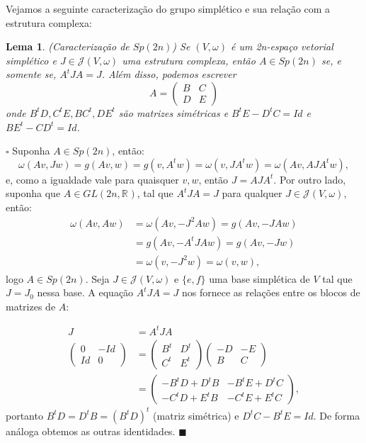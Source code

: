 \documentclass[12pt]{book}
\newtheorem{lema}[teorema]{Lema}
\newenvironment{prova}[1]{$\square$ #1}{\hfill$\blacksquare$}
\newcommand{\estruturacomplexa}{J_{0}}
\newcommand{\estruturascomplexaspadrao}{\mathcal{J}(V, \omega)}
\newcommand{\generalgroup}[2]{GL(#1, #2)}
\newcommand{\generalgroupreal}[1]{\generalgroup{#1}{\real{}}}
\newcommand{\gruposimpletico}[1]{Sp(#1)}
\newcommand{\real}[1]{\mathbb{R}^{#1}}
\begin{document}
	Vejamos a seguinte caracterização do grupo simplético e sua relação com a estrutura complexa:
	
	\begin{lema}\label{lema_caracterizacao_Sp2n}
		(Caracterização de $Sp(2n)$) Se $(V, \omega)$ é um 2n-espaço vetorial simplético e $J \in \estruturascomplexaspadrao$ uma estrutura complexa, então $A\in Sp(2n)$ se, e somente se, $A^{t}JA = J$. Além disso, podemos escrever 
		$$
		A=
		\left(
		\begin{array}{cc}
		B & C
		\\
		D & E
		\end{array}
		\right)
		$$
		onde $B^{t}D, C^{t}E, BC^{t}, DE^{t} $ são matrizes simétricas e $B^{t}E - D^{t}C = Id$ e $BE^{t} - CD^{t} = Id$.
	\end{lema}
	\begin{prova}
		Suponha $A \in Sp(2n)$, então:
		$$
		\omega(Av, Jw)= g(Av,w) = g(v,A^{t}w) = \omega(v, JA^{t}w) = \omega(Av, AJA^{t}w),
		$$
		e, como a igualdade vale para quaisquer $v,w$, então $J = AJA^{t}$. Por outro lado, suponha que $A \in \generalgroupreal{2n}$, tal que $A^{t}JA=J$ para qualquer $J \in \estruturascomplexaspadrao$, então:
		$$
		\begin{aligned}
		\omega(Av, Aw) &= \omega(Av, -J^{2}Aw)=g(Av, -JAw) \\
		&= g(Av, -A^{t}JAw) = g(Av, -Jw) 
		\\
		&= \omega(v, -J^{2}w) = \omega(v, w), 
		\end{aligned}
		$$
		logo $A \in \gruposimpletico{2n}$. Seja $J \in \estruturascomplexaspadrao$ e $\{e, f\}$ uma base simplética de $V$ tal que $J = \estruturacomplexa$ nessa base. A equação $A^{t}JA=J$ nos fornece as relações entre os blocos de matrizes de $A$:
		
		$$
		\begin{aligned}
			J &= A^{t}JA
			\\
			\left(
				\begin{array}{cc}
				0 & -Id
				\\
				Id & 0
				\end{array}
			\right)
			&=
			\left(
				\begin{array}{cc}
				B^{t} & D^{t}
				\\
				C^{t} & E^{t}
				\end{array}
			\right)
			\left(
				\begin{array}{cc}
				-D & -E
				\\
				B & C
				\end{array}
			\right)
			\\
			&=
			\left(
				\begin{array}{cc}
				-B^{t}D +D^{t}B & -B^{t}E+D^{t}C
				\\
				-C^{t}D+E^{t}B & -C^{t}E+E^{t}C
				\end{array}
			\right),
		\end{aligned}
		$$
		portanto $B^{t}D = D^{t}B = (B^{t}D)^{t}$ (matriz simétrica) e $D^{t}C-B^{t}E = Id$. De forma análoga obtemos as outras identidades.
	\end{prova}
	
\end{document}
